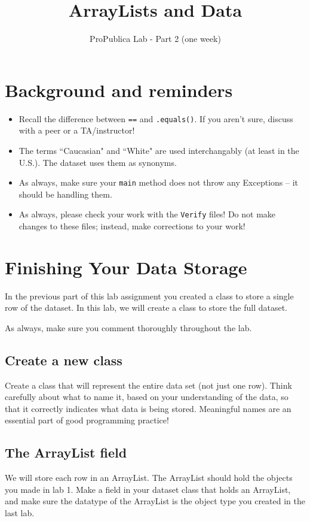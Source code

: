 \documentclass[12pt]{article}
\title{ArrayLists and Data}
\date{ProPublica Lab - Part 2 (one week)} %
\begin{document}
\maketitle

\section{Background and reminders}
\begin{itemize}
    \item Recall the difference between \texttt{==} and \texttt{.equals()}. If you aren't sure, discuss with a peer or a TA/instructor!
    \item The terms ``Caucasian" and ``White" are used interchangably (at least in the U.S.). The dataset uses them as synonyms.
    \item As always, make sure your \texttt{main} method does not throw any Exceptions -- it should be handling them.
    \item As always, please check your work with the \texttt{Verify} files! Do not make changes to these files; instead, make corrections to your work!
\end{itemize}

\section{Finishing Your Data Storage}
\label{storage}
In the previous part of this lab assignment you created a class to store a single row of the dataset.  In this lab, we will create a class to store the full dataset.

As always, make sure you comment thoroughly throughout the lab.

\subsection{Create a new class}
Create a class that will represent the entire data set (not just one row). Think carefully about what to name it, based on your understanding of the data, so that it correctly indicates what data is being stored. Meaningful names are an essential part of good programming practice!

\subsection{The ArrayList field}
\label{arrayList}
We will store each row in an ArrayList. The ArrayList should hold the objects you made in lab 1.  Make a field in your dataset class that holds an ArrayList, and make sure the datatype of the ArrayList is the object type you created in the last lab.
\end{document}
